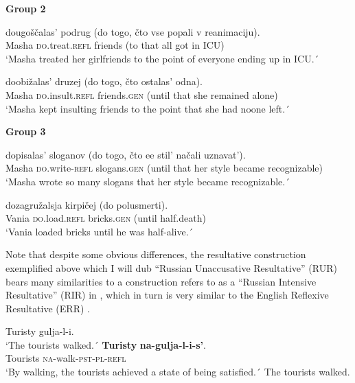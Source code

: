 \documentclass[output=paper,colorlinks,citecolor=brown,nonflat]{./langscibook}
\begin{document}
\textbf{Group 2}


\ea%
    \label{ex:antonyuk:31}
       {dougoščalas’}     {podrug} {(do} {togo,} {čto} {vse} {popali} {v}  {reanimaciju)}.\\
    Masha \textsc{do}.treat.\textsc{refl} friends (to that   {}       all  got      in {ICU})\\
    \glt `Masha treated her girlfriends to the point of everyone ending up in ICU.´
    \z

\ea%
    \label{ex:antonyuk:32}
       {doobižalas’}         {druzej}            {(do}   {togo,} {čto} {ostalas’}   {odna)}.\\
    Masha \textsc{do}.insult.\textsc{refl} friends.\textsc{gen}   (until that {}  she remained alone)\\
    \glt `Masha kept insulting friends to the point that she had noone left.´
    \z

\textbf{Group 3}

\ea%
    \label{ex:antonyuk:33}
       {dopisalas’}            {sloganov}       {(do}     {togo,} {čto} {ee} {stil’} {načali} uznavat’).\\
    Masha \textsc{do}.write-\textsc{refl}  slogans.\textsc{gen}  (until that   her     style became recognizable)\\
    \glt `Masha wrote so many slogans that her style became recognizable.´
    \z

\ea%
    \label{ex:antonyuk:34}
     {dozagružalsja}    {kirpičej}      {(do}    {polusmerti)}.\\
    Vania \textsc{do}.load.\textsc{refl} bricks.\textsc{gen} (until half.death)\\
    \glt `Vania loaded bricks until he was half-alive.´
    \z

Note that despite some obvious differences, the resultative construction exemplified above which I will dub “Russian Unaccusative Resultative” (RUR) bears many similarities to a construction \citet{Tatevosov2010} refers to as a “Russian Intensive Resultative” (RIR) in , which in turn is very similar to the English Reflexive Resultative (ERR) .


\ea%
    \label{ex:antonyuk:35}
    \ea \label{ex:antonyuk:35a}
    {Turisty} {gulja-l-i}.\\
    `The tourists walked.´ 
    \ex \label{ex:antonyuk:35b}
    \gll \textbf{Turisty} \textbf{na-gulja-l-i-s’}.\\
    Tourists \textsc{na-}walk\textsc{-pst-pl-refl}\\
    \glt `By walking, the tourists achieved a state of being satisfied.´ The tourists walked. 
    \z
\z
{}
\end{document}
